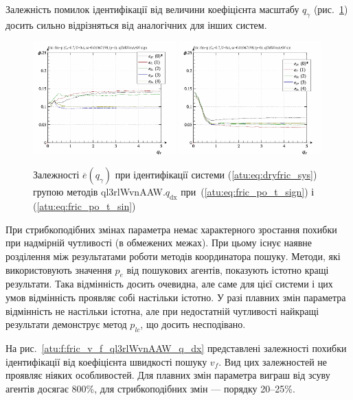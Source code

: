 Залежність помилок ідентифікації від величини коефіцієнта масштабу
$q_\gamma$
(рис.~\ref{atu:f:fric_q_gamma_ql3rlWvnAAW_q_dx})
досить сильно відрізняться від аналогічних для інших систем.

\begin{figure}[htb!]
  \centerline{
    \includegraphics[width=0.49\textwidth]{p/cha/fric/ql3rlWvnAAW/fric_id-p_q_gamma_sign.png}
    \hfill
    \includegraphics[width=0.49\textwidth]{p/cha/fric/ql3rlWvnAAW/fric_id-p_q_gamma_sin.png}
  }
\caption{Залежності $ \overline{e} (q_\gamma) $ при ідентифікації системи (\ref{atu:eq:dryfric_sys}) групою методів ql3rlWvnAAW.$q_\mathrm{dx} $ при~(\ref{atu:eq:fric_po_t_sign}) і (\ref{atu:eq:fric_po_t_sin})}
\label{atu:f:fric_q_gamma_ql3rlWvnAAW_q_dx}
\end{figure}

При стрибкоподібних змінах параметра немає характерного
зростання похибки при надмірній чутливості (в обмежених
межах). При цьому існує наявне розділення між результатами
роботи методів координатора пошуку. Методи, які використовують
значення
$ p_e $ від пошукових агентів, показують істотно кращі
результати. Така відмінність досить очевидна, але саме для цієї
системи і цих умов відмінність проявляє собі настільки істотно. У разі плавних
змін параметра відмінність не настільки істотна, але при
недостатній чутливості найкращі результати демонструє метод
$p_{lc}$, що досить несподівано.


На рис.~\ref{atu:f:fric_v_f_ql3rlWvnAAW_q_dx} представлені залежності похибки
ідентифікації від коефіцієнта швидкості пошуку
$v_f$. Вид цих залежностей не проявляє ніяких особливостей. Для
плавних змін параметра виграш від зсуву агентів досягає
800\%, для стрибкоподібних змін --- порядку 20--25\%.

